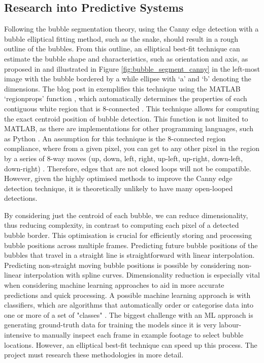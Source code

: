 \subsection{Research into Predictive Systems}
\label{bi_ps}
Following the bubble segmentation theory, using the Canny edge detection with a bubble elliptical fitting method, such as the snake, should result in a rough outline of the bubbles. From this outline, an elliptical best-fit technique can estimate the bubble shape and characteristics, such as orientation and axis, as proposed in \cite{thomanekAutomatedGasBubble2010} and illustrated in Figure \ref{fig:bubble_segment_canny} in the left-most image with the bubble bordered by a while ellipse with `a' and `b' denoting the dimensions. The blog post in \cite{steveeddinsEllipseVisualizationRegionprops2015} exemplifies this technique using the MATLAB `regionprops' function \cite{MeasurePropertiesImage}, which automatically determines the properties of each contiguous white region that is 8-connected \cite{rayryengAnswerExplanationMatlab2014}. This technique allows for computing the exact centroid position of bubble detection. This function is not limited to MATLAB, as there are implementations for other programming languages, such as Python \cite{MeasureRegionProperties}. An assumption for this technique is the 8-connected region compliance, where from a given pixel, you can get to any other pixel in the region by a series of 8-way moves (up, down, left, right, up-left, up-right, down-left, down-right) \cite{CourseNoteComputer}. Therefore, edges that are not closed loops will not be compatible. However, given the highly optimised methods to improve the Canny edge detection technique, it is theoretically unlikely to have many open-looped detections.

By considering just the centroid of each bubble, we can reduce dimensionality, thus reducing complexity, in contrast to computing each pixel of a detected bubble border. This optimisation is crucial for efficiently storing and processing bubble positions across multiple frames. Predicting future bubble positions of the bubbles that travel in a straight line is straightforward with linear interpolation. Predicting non-straight moving bubble positions is possible by considering non-linear interpolation with spline curves. Dimensionality reduction is especially vital when considering machine learning approaches to aid in more accurate predictions and quick processing. A possible machine learning approach is with classifiers, which are algorithms that automatically order or categorise data into one or more of a set of "classes" \cite{tobiasgeislermesevageMachineLearningClassifiers2020}. The biggest challenge with an ML approach is generating ground-truth data for training the models since it is very labour-intensive to manually inspect each frame in example footage to select bubble locations. However, an elliptical best-fit technique can speed up this process. The project must research these methodologies in more detail.

